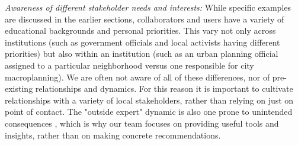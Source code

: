 
\textit{Awareness of different stakeholder needs and interests:} While specific examples are discussed in the earlier sections, collaborators and users have a variety of educational backgrounds and personal priorities. This vary not only across institutions (such as government officials and local activists having different priorities) but also within an institution (such as an urban planning official assigned to a particular neighborhood versus one responsible for city macroplanning). We are often not aware of all of these differences, nor of pre-existing relationships and dynamics. For this reason it is important to cultivate relationships with a variety of local stakeholders, rather than relying on just on point of contact. The "outside expert" dynamic is also one prone to unintended consequences \cite{easterly2015}, which is why our team focuses on providing useful tools and insights, rather than on making concrete recommendations.




\section{}


